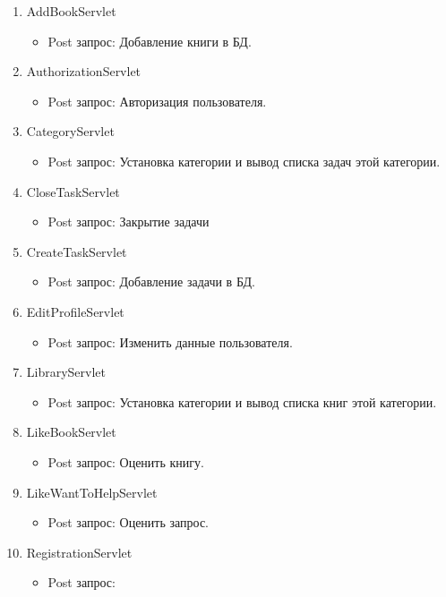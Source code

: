 \begin{enumerate}
\item AddBookServlet
	\begin{itemize} 
	\item Post запрос:	
	Добавление книги в БД.
	\end{itemize}
\item AuthorizationServlet
	\begin{itemize} 
	\item Post запрос:
	Авторизация пользователя.
	\end{itemize}
\item CategoryServlet
	\begin{itemize} 
	\item Post запрос:
	Установка категории и вывод списка задач этой категории.
	\end{itemize}
\item CloseTaskServlet
	\begin{itemize} 
	\item Post запрос:
	Закрытие задачи
	\end{itemize}
\item CreateTaskServlet
	\begin{itemize} 
	\item Post запрос:
	Добавление задачи в БД.
	\end{itemize}
\item EditProfileServlet
	\begin{itemize} 
	\item Post запрос:
	Изменить данные пользователя.
	\end{itemize}
\item LibraryServlet
	\begin{itemize} 
	\item Post запрос:
	Установка категории и вывод списка книг этой категории.
	\end{itemize}
\item LikeBookServlet
	\begin{itemize} 
	\item Post запрос:
	Оценить книгу.
	\end{itemize}
\item LikeWantToHelpServlet
	\begin{itemize} 
	\item Post запрос:
	Оценить запрос.
	\end{itemize}
\item RegistrationServlet
	\begin{itemize} 
	\item Post запрос:

\end{itemize}
\end{enumerate}
